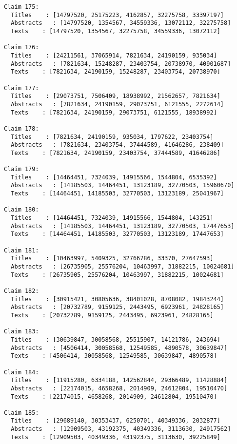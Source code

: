 \documentclass[11pt]{article}
\begin{document}
\begin{Verbatim}[commandchars=\\\{\}]
Claim 175:
  Titles    : [14797520, 25175223, 4162857, 32275758, 33397197]
  Abstracts   : [14797520, 1354567, 34559336, 13072112, 32275758]
  Texts    : [14797520, 1354567, 32275758, 34559336, 13072112]

Claim 176:
  Titles    : [24211561, 37065914, 7821634, 24190159, 935034]
  Abstracts   : [7821634, 15248287, 23403754, 20738970, 40901687]
  Texts    : [7821634, 24190159, 15248287, 23403754, 20738970]

Claim 177:
  Titles    : [29073751, 7506409, 18938992, 21562657, 7821634]
  Abstracts   : [7821634, 24190159, 29073751, 6121555, 2272614]
  Texts    : [7821634, 24190159, 29073751, 6121555, 18938992]

Claim 178:
  Titles    : [7821634, 24190159, 935034, 1797622, 23403754]
  Abstracts   : [7821634, 23403754, 37444589, 41646286, 238409]
  Texts    : [7821634, 24190159, 23403754, 37444589, 41646286]

Claim 179:
  Titles    : [14464451, 7324039, 14915566, 1544804, 6535392]
  Abstracts   : [14185503, 14464451, 13123189, 32770503, 15960670]
  Texts    : [14464451, 14185503, 32770503, 13123189, 25041967]

Claim 180:
  Titles    : [14464451, 7324039, 14915566, 1544804, 143251]
  Abstracts   : [14185503, 14464451, 13123189, 32770503, 17447653]
  Texts    : [14464451, 14185503, 32770503, 13123189, 17447653]

Claim 181:
  Titles    : [10463997, 5409325, 32766786, 33370, 27647593]
  Abstracts   : [26735905, 25576204, 10463997, 31882215, 10024681]
  Texts    : [26735905, 25576204, 10463997, 31882215, 10024681]

Claim 182:
  Titles    : [30915421, 30805636, 38401028, 8708082, 19843244]
  Abstracts   : [20732789, 9159125, 2443495, 6923961, 24828165]
  Texts    : [20732789, 9159125, 2443495, 6923961, 24828165]

Claim 183:
  Titles    : [30639847, 30058568, 25515907, 14121786, 243694]
  Abstracts   : [4506414, 30058568, 12549585, 4890578, 30639847]
  Texts    : [4506414, 30058568, 12549585, 30639847, 4890578]

Claim 184:
  Titles    : [11915280, 6334188, 142562844, 29366489, 11428884]
  Abstracts   : [22174015, 4658268, 2014909, 24612804, 19510470]
  Texts    : [22174015, 4658268, 2014909, 24612804, 19510470]

Claim 185:
  Titles    : [29689140, 30353437, 6250701, 40349336, 2032877]
  Abstracts   : [12909503, 43192375, 40349336, 3113630, 24917562]
  Texts    : [12909503, 40349336, 43192375, 3113630, 39225849]


\end{Verbatim}
\end{document}
